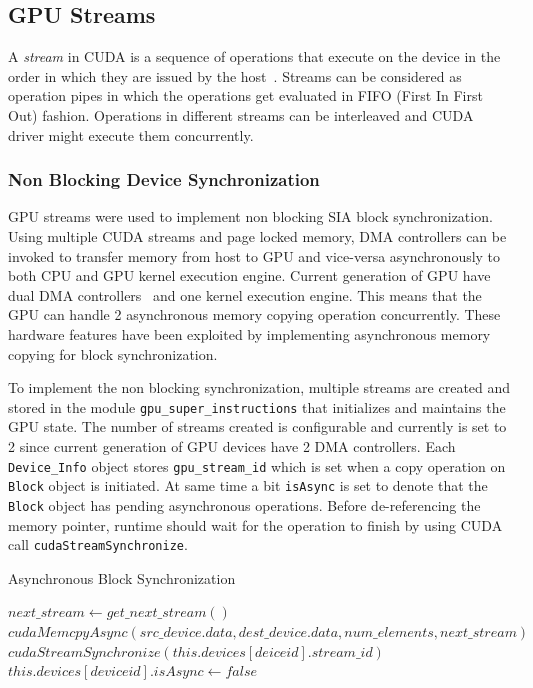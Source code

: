 \subsection{GPU Streams}
A \textit{stream} in CUDA is a sequence of operations that execute on the device
in the order in which they are issued by the host~\cite{overlapdatatransfer}.
Streams can be considered as operation pipes in which the operations get evaluated in
FIFO (First In First Out) fashion. Operations in different streams can be interleaved
and CUDA driver might execute them concurrently.

\subsubsection{Non Blocking Device Synchronization}\label{nonblockdevicesync}
GPU streams were used to implement non blocking SIA block synchronization. Using
multiple CUDA streams and page locked memory, DMA controllers can be invoked to
transfer memory from host to GPU and vice-versa asynchronously to both CPU and GPU
kernel execution engine. Current generation of GPU have dual DMA
controllers~\cite{teslaspecs}\cite{teslakspecs} and one kernel execution engine.
This means that the GPU can handle 2 asynchronous memory copying operation concurrently.
These hardware features have been exploited by implementing asynchronous memory
copying for block synchronization.

To implement the non blocking synchronization, multiple streams are created and
stored in the module \texttt{gpu\_super\_instructions} that initializes and
maintains the GPU state. The number of streams created is configurable and currently
is set to 2 since current generation of GPU devices have 2 DMA controllers. Each
\texttt{Device\_Info} object stores \texttt{gpu\_stream\_id} which is set when a
copy operation on \texttt{Block} object is initiated. At same time a bit
\texttt{isAsync} is set to denote that the \texttt{Block} object has pending
asynchronous operations. Before de-referencing the memory pointer, runtime should
wait for the operation to finish by using CUDA call \texttt{cudaStreamSynchronize}.

\begin{algorithm} {Asynchronous Block Synchronization}
  \singlespacing

  \begin{algorithmic}[1]
    \State $next\_stream \gets get\_next\_stream()$
    \State $cudaMemcpyAsync(src\_device.data, dest\_device.data, num\_elements, next\_stream)$
    \EndFunction
    \\
    \State $cudaStreamSynchronize(this.devices[deiceid].stream\_id)$
    \State $this.devices[deviceid].isAsync \gets false$
    \EndIf
    \State {}
    \EndFunction
  \end{algorithmic}
\end{algorithm}


